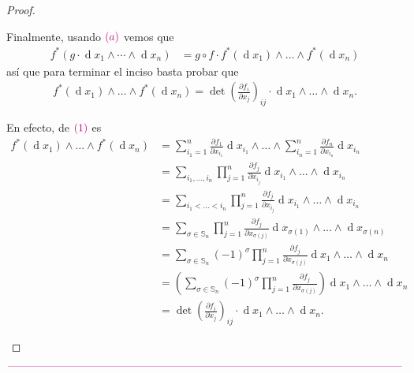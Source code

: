 \documentclass[11pt]{article}
\newcommand{\Ss}{\mathbb{S}}
\renewcommand{\d}{\operatorname{d}}
\newcommand{\paint}[1]{\color{color}{#1}}
\begin{document}
\begin{proof}
\begin{itemize}[listparindent = \parindent]
Finalmente, usando $\paint{(a)}$ vemos que
\begin{align*}
f^*(g\cdot\d x_1\wedge\cdots\wedge\d x_n) &= g \circ f \cdot f^*(\d x_1)\wedge\dots\wedge f^*(\d x_n)
\end{align*}
así que para terminar el inciso basta probar que
\begin{align*}
f^*(\d x_1)\wedge\dots\wedge f^*(\d x_n) = \det(\frac{\partial f_i}{\partial x_j})_{ij} \cdot  \d x_1 \wedge\dots\wedge\d x_n.
\end{align*}

En efecto, de $\paint{(1)}$ es
\begin{align*}
f^*(\d x_1)\wedge\dots\wedge f^*(\d x_n) &= \sum_{i_1=1}^n\frac{\partial f_1}{\partial x_{i_1}}\d {x_{i_1}} \wedge \dots \wedge \sum_{i_n=1}^n\frac{\partial f_n}{\partial x_{i_n}}\d {x_{i_n}}\\
&= \sum_{i_1, \dots, i_n}\prod_{j=1}^n\frac{\partial f_j}{\partial x_{i_j}} \d x_{i_1} \wedge\dots\wedge \d x_{i_n}\\
&= \sum_{i_1 < \dots < i_n} \prod_{j=1}^n\frac{\partial f_j}{\partial x_{i_j}} \d x_{i_1} \wedge\dots\wedge \d x_{i_n}\\
&= \sum_{\sigma \in \Ss_n} \prod_{j=1}^n\frac{\partial f_j}{\partial x_{\sigma(j)}} \d x_{\sigma(1)} \wedge\dots\wedge \d x_{\sigma(n)}\\
&= \sum_{\sigma \in \Ss_n} (-1)^\sigma \prod_{j=1}^n\frac{\partial f_j}{\partial x_{\sigma(j)}} \d x_1 \wedge\dots\wedge \d x_n\\
&= \left(\sum_{\sigma \in \Ss_n} (-1)^\sigma \prod_{j=1}^n\frac{\partial f_j}{\partial x_{\sigma(j)}}\right) \d x_1 \wedge\dots\wedge \d x_n\\
&= \det\left(\frac{\partial f_i}{\partial x_j}\right)_{ij} \cdot  \d x_1 \wedge\dots\wedge\d x_n.
\end{align*}
\end{itemize}
\end{proof}

\begin{center}
$\paint{
\rule{400pt}{0.5pt}
}$
\vspace{10pt}
\end{center}
\end{document}
